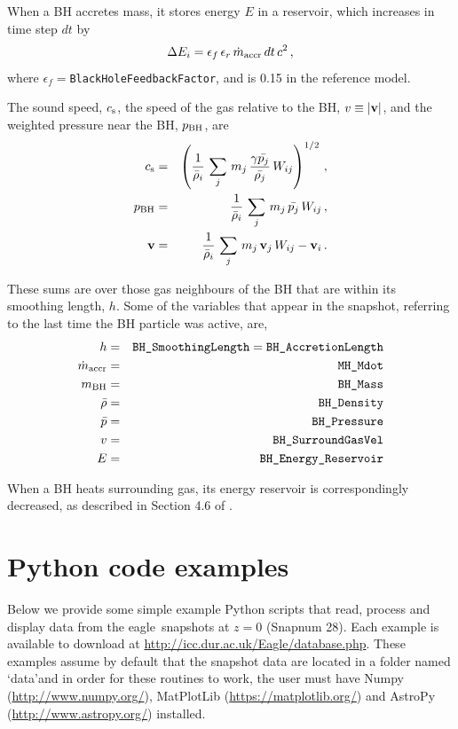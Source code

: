 \documentclass[10pt, a4paper]{article}
\newcommand{\eagle}{{\sc eagle}}
\begin{document}
\noindent When a BH accretes mass, it stores energy $E$ in a reservoir, which
increases in time step $dt$ by \begin{equation} \Delta E_i =
\epsilon_f\,\epsilon_r\,\dot m_{\rm accr}\,dt\,c^2\,, \end{equation} where
$\epsilon_f=$\texttt{BlackHoleFeedbackFactor}, and is 0.15 in the {\sc
reference} model.

\noindent The sound speed, $c_{\rm s}$, the speed of the gas relative to the BH,
$v\equiv |{\bf v}|$, and the weighted pressure near the BH, $p_{\rm BH}$, are
\begin{eqnarray} c_{\rm s} &=& \left({1\over\bar{\rho}_i}\, \sum_j\,
m_j\,{\gamma\bar{p_j}\over \bar{\rho_j}}\,W_{ij}\right)^{1/2}\,,\nonumber\\
p_{\rm BH} &=& {1\over\bar{\rho}_i}\, \sum_j\,
m_j\,\bar{p_j}\,W_{ij}\,,\nonumber\\ {\bf v}&=&{1\over\bar{\rho}_i}\, \sum_j\,
m_j\, {\bf v}_j \,W_{ij}-{\bf v}_i\,.  \end{eqnarray}

\noindent These sums are over those gas neighbours of the BH that are within its
smoothing length, $h$. Some of the variables that appear in the snapshot,
referring to the last time the BH particle was active, are, \begin{eqnarray} h
&=&
\hbox{\texttt{BH\_SmoothingLength}}=\hbox{\texttt{BH\_AccretionLength}}\nonumber\\
\dot m_{\rm accr} &=& \hbox{\texttt{MH\_Mdot}}\nonumber\\ m_{\rm BH} &=&
\hbox{\texttt{BH\_Mass}}\nonumber\\ \bar{\rho} &=&
\hbox{\texttt{BH\_Density}}\nonumber\\ \bar{p} &=&
\hbox{\texttt{BH\_Pressure}}\nonumber\\ v &=&
\hbox{\texttt{BH\_SurroundGasVel}}\nonumber\\ E &=&
\hbox{\texttt{BH\_Energy\_Reservoir}}\nonumber\\ \end{eqnarray}

\noindent When a BH heats surrounding gas, its energy reservoir is
correspondingly decreased, as described in Section 4.6 of \cite{schaye2015}.

\section{Python code examples}
\label{sect:python_examples}
Below we provide some simple example {\sc Python} scripts that read, process
and display data from the \eagle\ snapshots at $z=0$ ({\sc Snapnum} 28). Each
example is available to download at {\color{blue}
\href{http://icc.dur.ac.uk/Eagle/database.php}{http://icc.dur.ac.uk/Eagle/database.php}}.
These examples assume by default that the snapshot data are located in a folder
named \lq data\rq and in order for these routines to work, the user must have {\sc
Numpy} ({\color{blue}\href{http://www.numpy.org/}{http://www.numpy.org/}}), {\sc
MatPlotLib}
({\color{blue}\href{https://matplotlib.org/}{https://matplotlib.org/}}) and {\sc
AstroPy} ({\color{blue}\href{http://www.astropy.org/}{http://www.astropy.org/}})
installed.
\end{document}
